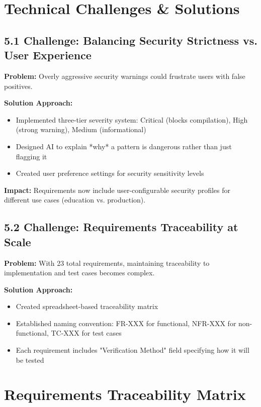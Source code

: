 \documentclass[a4paper,11pt]{article}
\begin{document}
\section{Technical Challenges \& Solutions}

\subsection{5.1 Challenge: Balancing Security Strictness vs. User Experience}

\textbf{Problem:} Overly aggressive security warnings could frustrate users with false positives.

\textbf{Solution Approach:}
\begin{itemize}[leftmargin=*]
    \item Implemented three-tier severity system: Critical (blocks compilation), High (strong warning), Medium (informational)
    \item Designed AI to explain *why* a pattern is dangerous rather than just flagging it
    \item Created user preference settings for security sensitivity levels
\end{itemize}

\textbf{Impact:} Requirements now include user-configurable security profiles for different use cases (education vs. production).

\subsection{5.2 Challenge: Requirements Traceability at Scale}

\textbf{Problem:} With 23 total requirements, maintaining traceability to implementation and test cases becomes complex.

\textbf{Solution Approach:}
\begin{itemize}[leftmargin=*]
    \item Created spreadsheet-based traceability matrix
    \item Established naming convention: FR-XXX for functional, NFR-XXX for non-functional, TC-XXX for test cases
    \item Each requirement includes "Verification Method" field specifying how it will be tested
\end{itemize}

\section{Requirements Traceability Matrix}
\end{document}

